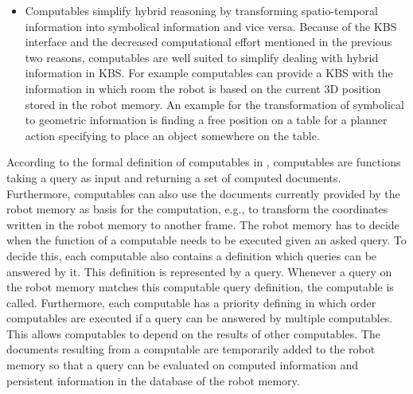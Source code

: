 \begin{itemize}
\item Computables simplify hybrid reasoning by transforming
  spatio-temporal information into symbolical information and vice
  versa. Because of the KBS interface and the decreased computational
  effort mentioned in the previous two reasons, computables are well
  suited to simplify dealing with hybrid information in KBS. For
  example computables can provide a KBS with the information in which
  room the robot is based on the current 3D position
  stored in the robot memory. An example for the transformation of
  symbolical to geometric information is finding a free position on a
  table for a planner action specifying to place an object somewhere on the table.
\end{itemize}

According to the formal definition of computables in
, computables are functions taking a query as
input and returning a set of computed documents. Furthermore,
computables can also use the documents currently provided by the robot
memory as basis for the computation, e.g., to transform the
coordinates written in the robot memory to another frame. The robot
memory has to decide when the function of a computable needs to be
executed given an asked query. To decide this, each computable also
contains a definition which queries can be answered by
it. This definition is represented by a query. Whenever a query on the
robot memory matches this computable query definition, the computable
is called. Furthermore, each computable has a priority defining in which
order computables are executed if a query can be answered by multiple
computables. This allows computables to depend on the results of
other computables. The documents resulting from a computable are
temporarily added to the robot memory so that a query can be evaluated
on computed information and persistent information in the database of
the robot memory.

